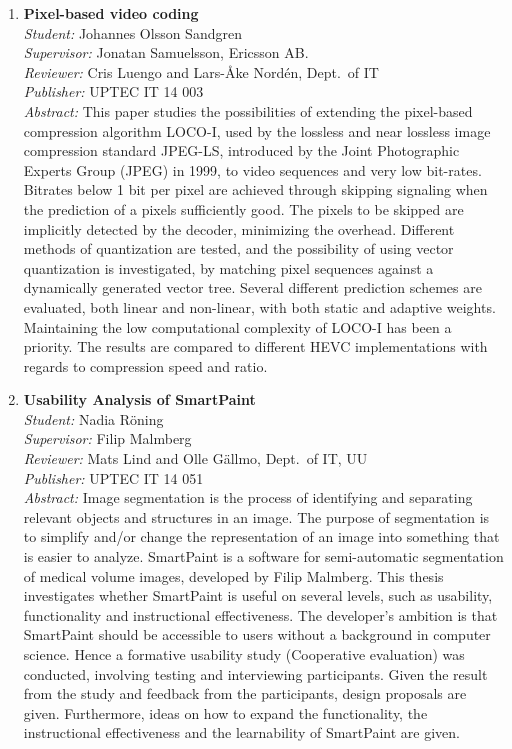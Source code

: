 \begin{small}
\begin{enumerate}
\item\textbf{Pixel-based video coding}\\
  \emph{Student:} Johannes Olsson Sandgren\\
  \emph{Supervisor:} Jonatan Samuelsson, Ericsson AB.\\
  \emph{Reviewer:} Cris Luengo and Lars-{\AA}ke Nord\'{e}n, Dept.~of IT\\
  \emph{Publisher:} UPTEC IT 14 003\\
  \emph{Abstract:} This paper studies the possibilities of extending the pixel-based compression algorithm LOCO-I, used by the lossless and near lossless image compression standard JPEG-LS, introduced by the Joint Photographic Experts Group (JPEG) in 1999, to video sequences and very low bit-rates. Bitrates below 1 bit per pixel are achieved through skipping signaling when the prediction of a pixels sufficiently good. The pixels to be skipped are implicitly detected  by the decoder, minimizing the overhead. Different methods of quantization are tested, and the possibility of using vector quantization is investigated, by matching pixel sequences against a dynamically generated vector tree. Several different prediction schemes are evaluated, both linear and non-linear, with both static and adaptive weights.  Maintaining the low computational complexity of LOCO-I has been a priority. The results are compared to different HEVC implementations with regards to compression speed and ratio.

\item\textbf{Usability Analysis of SmartPaint}\\
  \emph{Student:} Nadia R\"{o}ning \\
  \emph{Supervisor:} Filip Malmberg\\
  \emph{Reviewer:} Mats Lind and Olle G\"{a}llmo, Dept.~of IT, UU\\
  \emph{Publisher:} UPTEC IT 14 051\\
  \emph{Abstract:} Image segmentation is the process of identifying and separating relevant objects and structures in an image. The purpose of segmentation is to simplify and/or change the representation of an image into something that is easier to analyze. SmartPaint is a software for semi-automatic segmentation of medical volume  images, developed by Filip Malmberg.  This thesis investigates whether SmartPaint is useful on several levels, such as usability, functionality and instructional effectiveness. The developer's ambition is that SmartPaint should be accessible to users without a background in computer science. Hence a formative usability study (Cooperative evaluation) was conducted, involving testing and interviewing participants. Given  the result from the study and feedback from the participants, design proposals are given. Furthermore, ideas on how to expand the functionality, the instructional effectiveness and the learnability of SmartPaint are given.


\end{enumerate}
\end{small}
